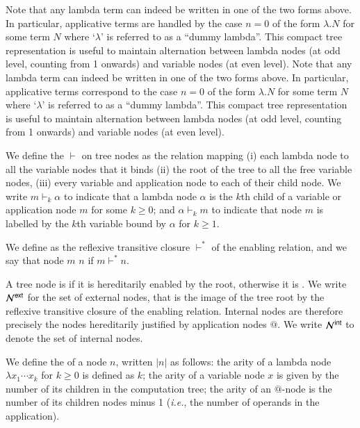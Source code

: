 \documentclass{elsarticle}
\makeatletter
\theoremstyle{plain}
\theoremstyle{definition}
\theoremstyle{remark}
\newcommand\Nodes{\mathcal{N}}%
\newcommand{\enables}{\vdash} %
\newcommand{\ExtNodes}{\Nodes^{\sf ext}}
\newcommand{\IntNodes}{\Nodes^{\sf int}}
\renewcommand\ie{{\it i.e.\@\xspace}}
\makeatother
\begin{document}
Note that any lambda term can indeed be written in one of the two forms above. In particular, applicative terms are handled by the case $n=0$ of the form $\lambda . N$ for some term $N$ where `$\lambda$' is referred to as a ``dummy lambda''. This compact tree representation is useful to maintain alternation between lambda nodes (at odd level, counting from 1 onwards) and variable nodes (at even level).
Note that any lambda term can indeed be written in one of the two forms above. In particular, applicative terms correspond to the case $n=0$ of the form $\lambda . N$ for some term $N$ where `$\lambda$' is referred to as a ``dummy lambda''. This compact tree representation is useful to maintain alternation between lambda nodes (at odd level, counting from 1 onwards) and variable nodes (at even level).

We define the  $\enables$ on tree nodes as the relation mapping (i) each lambda node to all the variable nodes that it binds (ii) the root of the tree to all the free variable nodes, (iii) every variable and application node to each of their child node. We write $m \enables_k \alpha$ to indicate that a lambda node $\alpha$ is the $k$th child of a variable or application node $m$ for some $k\geq0$; and $\alpha \enables_k m$ to indicate that node $m$ is labelled by the $k$th variable bound by $\alpha$ for $k\geq1$.

We define  as the reflexive transitive closure $\enables^*$ of the enabling relation, and we say that node $m$  $n$ if $m \enables^* n$.

A tree node is  if it is hereditarily enabled by the root, otherwise it is . We write $\ExtNodes$ for the set of external nodes, that is the image of the tree root by the reflexive transitive closure of the enabling relation. Internal nodes are therefore precisely the nodes hereditarily justified by application nodes $@$. We write $\IntNodes$ to denote the set of internal nodes.

We define the  of a node $n$, written $|n|$ as follows: the arity of a lambda node $\lambda x_1 \cdots x_k$ for $k\geq 0$ is defined as $k$; the arity of a variable node $x$ is given by the number of its children in the computation tree; the arity of an $@$-node is the number of its children nodes minus 1 (\ie, the number of operands in the application).
\end{document}
